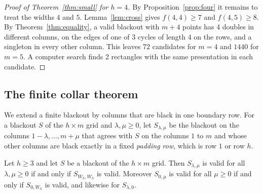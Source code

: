 \begin{proof}[Proof of Theorem~\ref{thm:small} for $h=4$]
By Proposition~\ref{prop:four} it remains to treat the widths $4$ and $5$.
Lemma~\ref{lem:cross} gives $f(4,4)\ge7$ and $f(4,5)\ge8$. By
Theorem~\ref{thm:equality}, a valid blackout with $m+4$ points has 4 doubles in different
columns, on the edges of one of 3 cycles of length $4$ on the rows, and a singleton in
every other column. This leaves $72$ candidates for $m=4$ and $1440$ for $m=5$. A computer
search finds 2 rectangles with the same presentation in each candidate.
\end{proof}

\subsection{The finite collar theorem}

We extend a finite blackout by columns that are black in one boundary row. For a blackout
$S$ of the $h\times m$ grid and $\lambda,\mu\ge0$, let $S_{\lambda,\mu}$ be the blackout on
the columns $1-\lambda,\dots,m+\mu$ that agrees with $S$ on the columns $1$ to $m$ and
whose other columns are black exactly in a fixed \emph{padding row}, which is row $1$ or
row $h$.

\begin{theorem}\label{thm:collar}
Let $h\ge3$ and let $S$ be a blackout of the $h\times m$ grid. Then
$S_{\lambda,\mu}$ is valid for all $\lambda,\mu\ge0$ if and only if $S_{W_h,W_h}$ is
valid. Moreover $S_{0,\mu}$ is valid for all $\mu\ge0$ if and only if $S_{0,W_h}$ is
valid, and likewise for $S_{\lambda,0}$.
\end{theorem}

